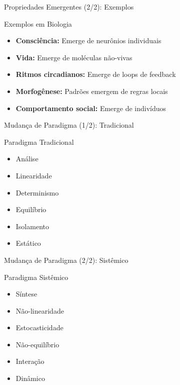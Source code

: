 \begin{frame}{Propriedades Emergentes (2/2): Exemplos}
\begin{exampleblock}{Exemplos em Biologia}
\begin{itemize}
    \item \textbf{Consciência:} Emerge de neurônios individuais
    \item \textbf{Vida:} Emerge de moléculas não-vivas
    \item \textbf{Ritmos circadianos:} Emerge de loops de feedback
    \item \textbf{Morfogênese:} Padrões emergem de regras locais
    \item \textbf{Comportamento social:} Emerge de indivíduos
\end{itemize}
\end{exampleblock}
\end{frame}

\begin{frame}{Mudança de Paradigma (1/2): Tradicional}
\begin{center}
\begin{alertblock}{Paradigma Tradicional}
\begin{itemize}
    \item Análise
    \item Linearidade
    \item Determinismo
    \item Equilíbrio
    \item Isolamento
    \item Estático
\end{itemize}
\end{alertblock}
\end{center}
\end{frame}

\begin{frame}{Mudança de Paradigma (2/2): Sistêmico}
\begin{center}
\begin{exampleblock}{Paradigma Sistêmico}
\begin{itemize}
    \item Síntese
    \item Não-linearidade
    \item Estocasticidade
    \item Não-equilíbrio
    \item Interação
    \item Dinâmico
\end{itemize}
\end{exampleblock}
\end{center}
\end{frame}

